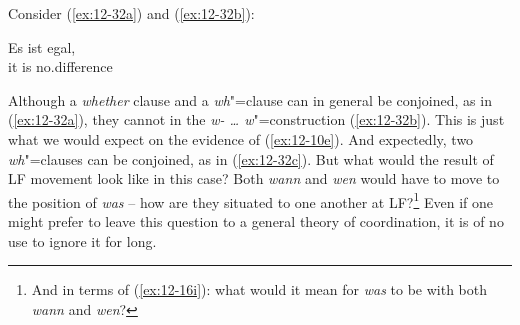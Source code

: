 \documentclass[output=paper]{langsci/langscibook}
\begin{document}
Consider (\ref{ex:12-32a}) and (\ref{ex:12-32b}):
\begin{exe}
\ex
\label{ex:12-32}
\gll
Es ist egal,\\
it is no.difference \\
\begin{xlist}
\end{xlist} 
\end{exe}
Although a \textit{whether} clause and a \emph{wh}"=clause can in
general be conjoined, as in (\ref{ex:12-32a}), they cannot in the \textit{w- \ldots{}  w}"=construction (\ref{ex:12-32b}). This is just what we would expect on the evidence
of (\ref{ex:12-10e}).  And expectedly, two \textit{wh}"=clauses can be conjoined,
as in (\ref{ex:12-32c}). But what would the result of LF movement look like in
this case? Both \textit{wann} and \textit{wen} would have to move to
the position of \textit{was} -- how are they situated to one another at
LF?\footnote{%
	And in terms of (\ref{ex:12-16i}): what would it mean for
  \textit{was} to be  with both \textit{wann} and
  \textit{wen}?%
}
Even if one might prefer to leave this question to a
general theory of coordination, it is of no use to ignore it for long.
 
\end{document}
